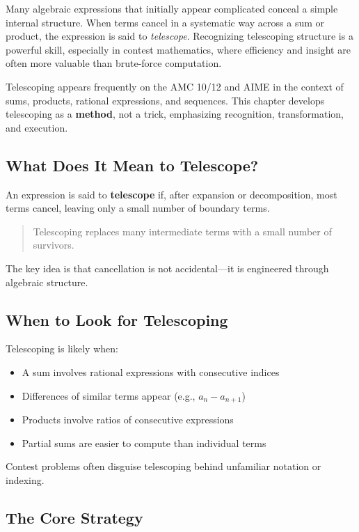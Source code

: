 \documentclass[12pt]{extarticle}
\begin{document}
Many algebraic expressions that initially appear complicated conceal a simple internal structure. When terms cancel in a systematic way across a sum or product, the expression is said to \emph{telescope}. Recognizing telescoping structure is a powerful skill, especially in contest mathematics, where efficiency and insight are often more valuable than brute-force computation.

Telescoping appears frequently on the AMC 10/12 and AIME in the context of sums, products, rational expressions, and sequences. This chapter develops telescoping as a \textbf{method}, not a trick, emphasizing recognition, transformation, and execution.

\subsection*{What Does It Mean to Telescope?}

An expression is said to \textbf{telescope} if, after expansion or decomposition, most terms cancel, leaving only a small number of boundary terms.

\begin{quote}
Telescoping replaces many intermediate terms with a small number of survivors.
\end{quote}

The key idea is that cancellation is not accidental—it is engineered through algebraic structure.

\subsection*{When to Look for Telescoping}

Telescoping is likely when:
\begin{itemize}
    \item A sum involves rational expressions with consecutive indices
    \item Differences of similar terms appear (e.g., $a_n - a_{n+1}$)
    \item Products involve ratios of consecutive expressions
    \item Partial sums are easier to compute than individual terms
\end{itemize}

Contest problems often disguise telescoping behind unfamiliar notation or indexing.

\subsection*{The Core Strategy}
\end{document}
